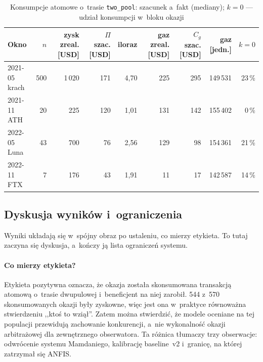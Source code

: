 \begin{table}[H]\centering\scriptsize\setlength{\tabcolsep}{3.5pt}
\caption{Konsumpcje atomowe o~trasie \texttt{two\_pool}: szacunek a~fakt (mediany); $k=0$ ---
  udział konsumpcji w~bloku okazji}\label{tab:realized}
\begin{tabular}{lrrrrrrrr}
\toprule
Okno & $n$ & zysk zreal. [USD] & $\Pi$ szac. [USD] & iloraz & gaz zreal. [USD] & $C_g$ szac. [USD] & gaz [jedn.] & $k=0$ \\
\midrule
2021-05 krach & 500 & 1\,020 & 171 & 4{,}70 & 225 & 295 & 149\,531 & 23\,\% \\
2021-11 ATH   & 20  & 225    & 120 & 1{,}01 & 131 & 142 & 155\,402 & 0\,\% \\
2022-05 Luna  & 43  & 700    & 76  & 2{,}56 & 129 & 98  & 154\,361 & 21\,\% \\
2022-11 FTX   & 7   & 176    & 43  & 1{,}91 & 11  & 17  & 142\,587 & 14\,\% \\
\bottomrule
\end{tabular}
\end{table}

\subsection{Dyskusja wyników i~ograniczenia}

Wyniki układają się w~spójny obraz po ustaleniu, co mierzy etykieta. To tutaj zaczyna się
dyskusja, a~kończy ją lista ograniczeń systemu.

\paragraph{Co mierzy etykieta?} Etykieta pozytywna oznacza, że okazja została skonsumowana
transakcją atomową o~trasie dwupulowej i~beneficjent na niej zarobił. 544 z~570 skonsumowanych
okazji były zyskowne, więc jest ona w~praktyce równoważna stwierdzeniu ,,ktoś to wziął''. Zatem
można stwierdzić, że modele oceniane na tej populacji przewidują zachowanie konkurencji, a~nie
wykonalność okazji arbitrażowej dla zewnętrznego obserwatora. Ta różnica tłumaczy trzy
obserwacje: odwrócenie systemu Mamdaniego, kalibrację baseline~v2 i~granicę, na której zatrzymał
się ANFIS.

